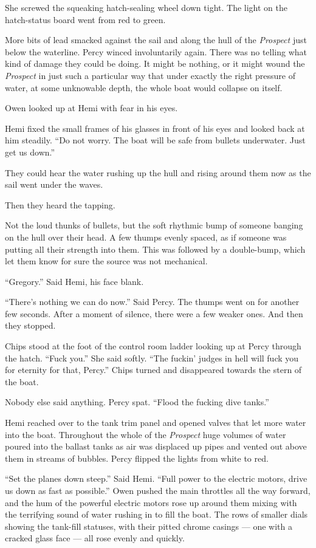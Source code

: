 \documentclass[
]{scrbook}
\begin{document}
She screwed the squeaking hatch-sealing wheel down tight. The light on
the hatch-status board went from red to green.

More bits of lead smacked against the sail and along the hull of the
\emph{Prospect} just below the waterline. Percy winced involuntarily
again. There was no telling what kind of damage they could be doing. It
might be nothing, or it might wound the \emph{Prospect} in just such a
particular way that under exactly the right pressure of water, at some
unknowable depth, the whole boat would collapse on itself.

Owen looked up at Hemi with fear in his eyes.

Hemi fixed the small frames of his glasses in front of his eyes and
looked back at him steadily. ``Do not worry. The boat will be safe from
bullets underwater. Just get us down.''

They could hear the water rushing up the hull and rising around them now
as the sail went under the waves.

Then they heard the tapping.

Not the loud thunks of bullets, but the soft rhythmic bump of someone
banging on the hull over their head. A few thumps evenly spaced, as if
someone was putting all their strength into them. This was followed by a
double-bump, which let them know for sure the source was not mechanical.

``Gregory.'' Said Hemi, his face blank.

``There's nothing we can do now.'' Said Percy. The thumps went on for
another few seconds. After a moment of silence, there were a few weaker
ones. And then they stopped.

Chips stood at the foot of the control room ladder looking up at Percy
through the hatch. ``Fuck you.'' She said softly. ``The fuckin' judges
in hell will fuck you for eternity for that, Percy.'' Chips turned and
disappeared towards the stern of the boat.

Nobody else said anything. Percy spat. ``Flood the fucking dive tanks.''

Hemi reached over to the tank trim panel and opened valves that let more
water into the boat. Throughout the whole of the \emph{Prospect} huge
volumes of water poured into the ballast tanks as air was displaced up
pipes and vented out above them in streams of bubbles. Percy flipped the
lights from white to red.

``Set the planes down steep.'' Said Hemi. ``Full power to the electric
motors, drive us down as fast as possible.'' Owen pushed the main
throttles all the way forward, and the hum of the powerful electric
motors rose up around them mixing with the terrifying sound of water
rushing in to fill the boat. The rows of smaller dials showing the
tank-fill statuses, with their pitted chrome casings --- one with a
cracked glass face --- all rose evenly and quickly.
\end{document}
